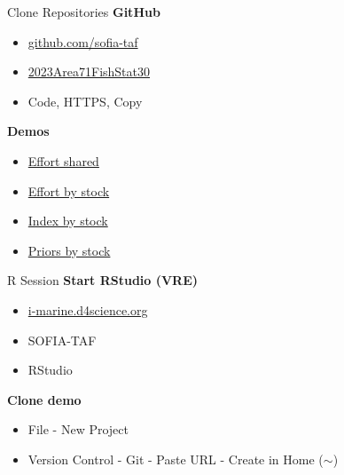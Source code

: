 \documentclass[aspectratio=169]{beamer}
\begin{document}

\begin{frame}{Clone Repositories}
  \textbf{\darkgreen GitHub}\\[0.5ex]
  \begin{itemize}\blue
    \item[] \href{https://github.com/sofia-taf}{github.com/sofia-taf}\\[1ex]
    \item[] \href{https://github.com/sofia-taf/2023Area71FishStat30}{2023Area71FishStat30}\black
    \item[] Code, HTTPS, Copy\\[1ex]
  \end{itemize}
  \vspace{3ex}
  \textbf{\darkgreen Demos}\\[0.5ex]
  \begin{itemize}\blue
    \item[] \href{https://github.com/sofia-taf/WorkshopEffortShared}{Effort shared}\\[1ex]
    \item[] \href{https://github.com/sofia-taf/WorkshopEffortByStock}{Effort by stock}\\[1ex]
    \item[] \href{https://github.com/sofia-taf/WorkshopIndexByStock}{Index by stock}\\[1ex]
    \item[] \href{https://github.com/sofia-taf/WorkshopPriorsByStock}{Priors by stock}
  \end{itemize}
\end{frame}


\begin{frame}{R Session}
  \textbf{\darkgreen Start RStudio (VRE)}\\[0.3ex]
  \begin{itemize}
    \item[] {\blue\href{https://i-marine.d4science.org/}%
      {i-marine.d4science.org}}\\[1ex]
    \item[] SOFIA-TAF\\[1ex]
    \item[] RStudio\\[1ex]
  \end{itemize}
  \vspace{4ex}
  \textbf{\darkgreen Clone demo}\\[0.3ex]
  \begin{itemize}
    \item[] File - New Project\\[1ex]
    \item[] Version Control - Git - Paste URL - Create in Home ($\sim$)\\[1ex]
  \end{itemize}
\end{frame}
\end{document}

